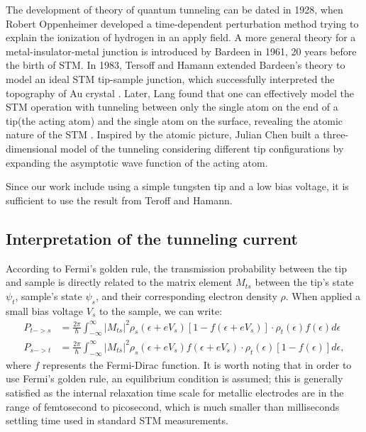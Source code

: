The development of theory of quantum tunneling can be dated in 1928, when Robert Oppenheimer developed a time-dependent perturbation method trying to explain the ionization of hydrogen in an apply field\cite{oppenheimerThreeNotesQuantum1928}. A more general theory for a metal-insulator-metal junction is introduced by Bardeen in 1961\cite{bardeenTunnellingManyParticlePoint1961}, 20 years before the birth of \ac{STM}. In 1983, Tersoff and Hamann extended Bardeen's theory to model an ideal STM tip-sample junction, which successfully interpreted the topography of Au crystal \cite{tersoffTheoryApplicationScanning1983}\cite{tersoffTheoryScanningTunneling1985}. Later, Lang found that one can effectively model the \ac{STM} operation with tunneling between only the single atom on the end of a tip(the acting atom) and the single atom on the surface, revealing the atomic nature of the \ac{STM} \cite{langVacuumTunnelingCurrent1985}\cite{langSpectroscopySingleAtoms1986}\cite{langApparentSizeAtom1987}. Inspired by the atomic picture, Julian Chen built a three-dimensional model of the tunneling considering different tip configurations by expanding the asymptotic wave function of the acting atom\cite{chenTunnelingMatrixElements1990}\cite{chenTheoryScanningTunneling1988}. 

Since our work include using a simple tungsten tip and a low bias voltage, it is sufficient to use the result from Teroff and Hamann.  

\subsection{Interpretation of the tunneling current}
According to Fermi's golden rule, the transmission probability between the tip and sample is directly related to the matrix element $M_{ts}$ between the tip's state $\psi_{t}$, sample's state $\psi_{s}$, and their corresponding electron density $\rho$. When applied a small bias voltage $V_s$ to the sample, we can write:
\begin{align}
	P_{t->s} &= \frac{2\pi}{\hslash}\int_{-\infty}^{\infty}|M_{ts}|^2\rho_s(\epsilon + eV_s)[1-f(\epsilon+eV_s)]\cdot \rho_t(\epsilon)f(\epsilon) d\epsilon \\
	P_{s->t} &= \frac{2\pi}{\hslash}\int_{-\infty}^{\infty}|M_{ts}|^2\rho_s(\epsilon + eV_s)f(\epsilon+eV_s)\cdot \rho_t(\epsilon)[1-f(\epsilon)] d\epsilon,
\end{align} 
where $f$ represents the Fermi-Dirac function. It is worth noting that in order to use Fermi's golden rule, an equilibrium condition is assumed; this is generally satisfied as the internal relaxation time scale for metallic electrodes are in the range of femtosecond to picosecond, which is much smaller than milliseconds settling time used in standard \ac{STM} measurements. 

